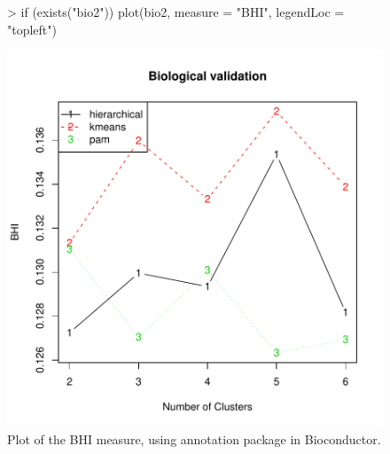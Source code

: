 \documentclass[11pt]{article}
\begin{document}
\begin{figure}
  \centering
\begin{Schunk}
\begin{Sinput}
> if (exists("bio2")) plot(bio2, measure = "BHI", legendLoc = "topleft")
\end{Sinput}
\end{Schunk}
\includegraphics{clValid-021}
  \caption{Plot of the BHI measure, using annotation package
     in Bioconductor.}
  \label{fig:BHI2}
\end{figure}
\end{document}
